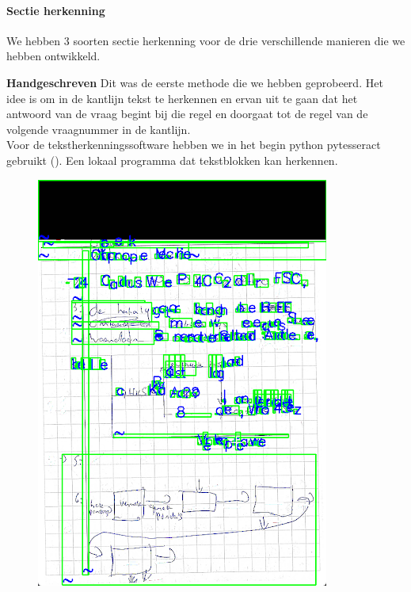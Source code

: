 \documentclass[12pt]{article}
\begin{document}
\paragraph*{Sectie herkenning} We hebben 3 soorten sectie herkenning voor de drie verschillende manieren die we hebben ontwikkeld. 
\begin{multicols}{2} 
\textbf{Handgeschreven} 
Dit was de eerste methode die we hebben geprobeerd. Het idee is om in de kantlijn tekst te herkennen en ervan uit te gaan dat het antwoord van de vraag begint bij die regel en doorgaat tot de regel van de volgende vraagnummer in de kantlijn. \\
Voor de tekstherkenningssoftware hebben we in het begin python pytesseract gebruikt (\cite{tesseractManual, pytesseractManual}). Een lokaal programma dat tekstblokken kan herkennen.
\begin{figure}[H]
    \centering
    \includegraphics[width=\linewidth]{./images/methoden/inscannen/sectie/hand/handgeschreven.png}

\end{figure}
\end{multicols}
\end{document}
